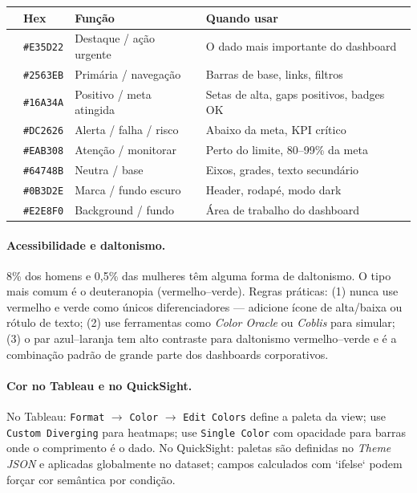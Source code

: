 \begin{BoardBox}[title=Paleta de 8 Funções --- Referência Rápida]
\begin{tabular}{@{}p{0.25cm}lll@{}}
\toprule
& \textbf{Hex} & \textbf{Função} & \textbf{Quando usar} \\
\midrule
\colorbox{colDestaque}{\phantom{M}} & \texttt{\#E35D22} & Destaque / ação urgente & O dado mais importante do dashboard \\
\colorbox{colPrimaria}{\phantom{M}} & \texttt{\#2563EB} & Primária / navegação    & Barras de base, links, filtros \\
\colorbox{colPositivo}{\phantom{M}} & \texttt{\#16A34A} & Positivo / meta atingida & Setas de alta, gaps positivos, badges OK \\
\colorbox{colAlerta}{\phantom{M}}   & \texttt{\#DC2626} & Alerta / falha / risco  & Abaixo da meta, KPI crítico \\
\colorbox{colAtencao}{\phantom{M}}  & \texttt{\#EAB308} & Atenção / monitorar     & Perto do limite, 80--99\% da meta \\
\colorbox{colNeutra}{\phantom{M}}   & \texttt{\#64748B} & Neutra / base           & Eixos, grades, texto secundário \\
\colorbox{colMarca}{\phantom{M}}    & \texttt{\#0B3D2E} & Marca / fundo escuro    & Header, rodapé, modo dark \\
\colorbox{colBgClaro}{\phantom{M}}  & \texttt{\#E2E8F0} & Background / fundo      & Área de trabalho do dashboard \\
\bottomrule
\end{tabular}
\end{BoardBox}

\paragraph{Acessibilidade e daltonismo.}
8\% dos homens e 0,5\% das mulheres têm alguma forma de daltonismo. O tipo mais comum é o deuteranopia (vermelho--verde). Regras práticas: (1) nunca use vermelho e verde como únicos diferenciadores --- adicione ícone de alta/baixa ou rótulo de texto; (2) use ferramentas como \textit{Color Oracle} ou \textit{Coblis} para simular; (3) o par azul--laranja tem alto contraste para daltonismo vermelho--verde e é a combinação padrão de grande parte dos dashboards corporativos.

\paragraph{Cor no Tableau e no QuickSight.}
No Tableau: \texttt{Format} $\to$ \texttt{Color} $\to$ \texttt{Edit Colors} define a paleta da view; use \texttt{Custom Diverging} para heatmaps; use \texttt{Single Color} com opacidade para barras onde o comprimento é o dado. No QuickSight: paletas são definidas no \textit{Theme JSON} e aplicadas globalmente no dataset; campos calculados com `ifelse` podem forçar cor semântica por condição.

